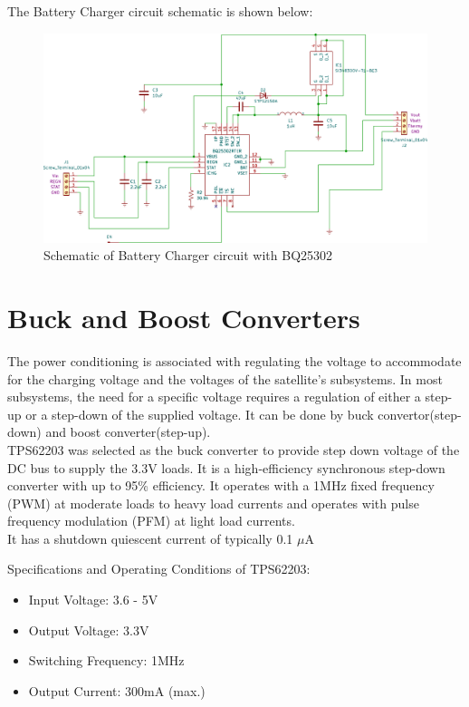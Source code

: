 The Battery Charger circuit schematic is shown below:
\begin{figure}[ht]
	\centering
	\includegraphics[width=\columnwidth]{IMGS/charg.pdf}
	\caption{Schematic of Battery Charger circuit with BQ25302}
	\label{fig:battch}
\end{figure}


\section[Switching Regulators]{Buck and Boost Converters}
The power conditioning is associated with regulating the voltage to accommodate
for the charging voltage and the voltages of the satellite's subsystems. In most
subsystems, the need for a specific voltage requires a regulation of either a step-up
or a step-down of the supplied voltage. It can be done by buck
convertor(step-down) and boost converter(step-up).\\
TPS62203 was selected as the buck converter to provide step down voltage of the DC bus to supply the 3.3V loads. It is a high-efficiency synchronous step-down converter with up to 95\% efficiency. It operates with a 1MHz fixed frequency (PWM) at moderate loads to heavy load currents and operates with pulse
frequency modulation (PFM) at light load currents.\\

It has a shutdown quiescent current of typically 0.1 {$\mu$}A

 Specifications and Operating Conditions of TPS62203:
\begin{itemize}
	\item Input Voltage: 3.6 - 5V
	\item Output Voltage:  3.3V
	\item Switching Frequency: 1MHz
	\item Output Current: 300mA (max.)
\end{itemize}


